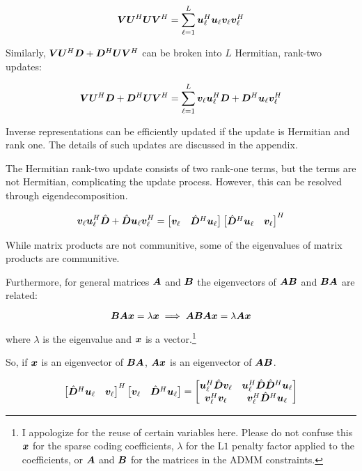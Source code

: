 \begin{equation}
\bm{V}\bm{U}^H\bm{U}\bm{V}^H = \sum_{\ell = 1}^L \bm{u}_{\ell}^H\bm{u}_{\ell}\bm{v}_{\ell}\bm{v}_{\ell}^H
\end{equation}

Similarly, $\bm{V}\bm{U}^H\bm{D} + \bm{D}^H\bm{U}\bm{V}^H$ can be broken into $L$ Hermitian, rank-two updates:

\begin{equation}
\bm{V}\bm{U}^H\bm{D} + \bm{D}^H\bm{U}\bm{V}^H = \sum_{\ell = 1}^{L} \bm{v}_{\ell}\bm{u}_{\ell}^H\bm{D} + \bm{D}^H\bm{u}_{\ell}\bm{v}_{\ell}^H
\end{equation}


Inverse representations can be efficiently updated if the update is Hermitian and rank one. The details of such updates are discussed in the appendix.

The Hermitian rank-two update consists of two rank-one terms, but the terms are not Hermitian, complicating the update process. However, this can be resolved through eigendecomposition.  

\begin{equation}
\bm{v}_{\ell}\bm{u}_{\ell}^H \hat{\bm{D}} + \hat{\bm{D}}\bm{u}_{\ell}\bm{v}_{\ell}^H = \begin{bmatrix}
\bm{v}_{\ell} & \hat{\bm{D}}^H\bm{u}_{\ell} 
\end{bmatrix}
\begin{bmatrix}
\hat{\bm{D}}^H\bm{u}_{\ell} & \bm{v}_{\ell}
\end{bmatrix}^H
\end{equation}

While matrix products are not communitive, some of the eigenvalues of matrix products are communitive.

Furthermore, for general matrices $\bm{A}$ and $\bm{B}$ the eigenvectors of $\bm{A}\bm{B}$ and $\bm{B}\bm{A}$ are related:

\begin{equation}
\bm{B}\bm{A}\bm{x} = \lambda\bm{x}  \implies  \bm{A}\bm{B}\bm{A}\bm{x} = \lambda\bm{A}\bm{x}
\end{equation}

where $\lambda$ is the eigenvalue and $\bm{x}$ is a vector.\footnote{I appologize for the reuse of certain variables here. Please do not confuse this $\bm{x}$ for the sparse coding coefficients, $\lambda$ for the L$1$ penalty factor applied to the coefficients, or $\bm{A}$ and $\bm{B}$ for the matrices in the ADMM constraints.}

So, if $\bm{x}$ is an eigenvector of $\bm{B}\bm{A}$, $\bm{A}\bm{x}$ is an eigenvector of $\bm{A}\bm{B}$.


\begin{equation}
\begin{bmatrix}
\hat{\bm{D}}^H\bm{u}_{\ell} & \bm{v}_{\ell}
\end{bmatrix}^H
\begin{bmatrix}
\bm{v}_{\ell} & \hat{\bm{D}}^H\bm{u}_{\ell} 
\end{bmatrix}
 = 
\begin{bmatrix}
\bm{u}_{\ell}^H\hat{\bm{D}}\bm{v}_{\ell} & \bm{u}_{\ell}^H\hat{\bm{D}}\hat{\bm{D}}^H\bm{u}_{\ell} \\
\bm{v}_{\ell}^H\bm{v}_{\ell}    & \bm{v}_{\ell}^H\hat{\bm{D}}^H\bm{u}_{\ell}
\end{bmatrix}
\end{equation}


